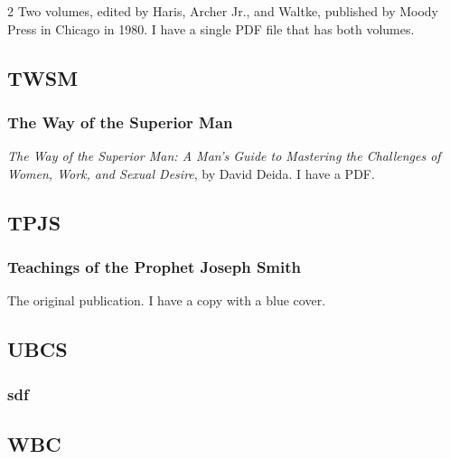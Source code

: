 \begin{multicols}{2}
			Two volumes, edited by Haris, Archer Jr., and Waltke, published by Moody Press in Chicago in 1980. I have a single PDF file that has both volumes. 
			
	\subsection*{TWSM}
	
		\subsubsection*{The Way of the Superior Man}
		
			\textit{The Way of the Superior Man: A Man's Guide to Mastering the Challenges of Women, Work, and Sexual Desire}, by David Deida. I have a PDF.
		
	\subsection*{TPJS}
	
		\subsubsection*{Teachings of the Prophet Joseph Smith}
		
			The original publication. I have a copy with a blue cover.
			
	\subsection*{UBCS}
	
		\subsubsection*{sdf}
		
	\subsection*{WBC}
	

\end{multicols}
